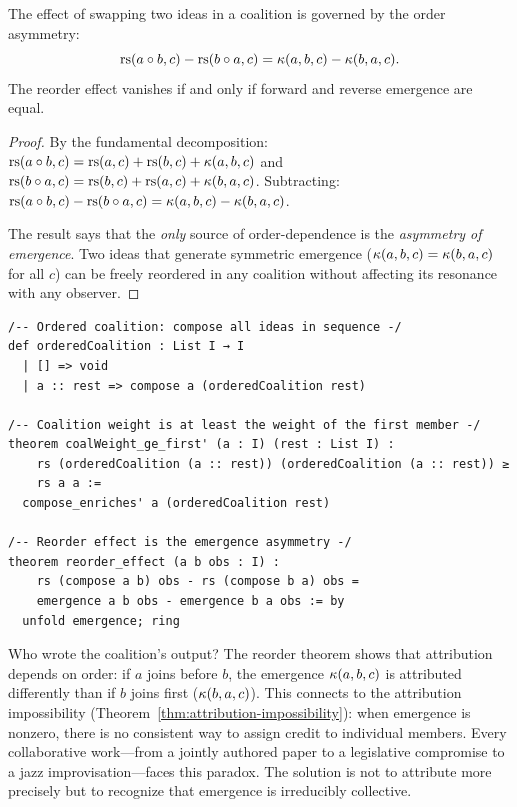 \begin{theorem}
\label{thm:reorder}
The effect of swapping two ideas in a coalition is governed by the
order asymmetry:
\[
\mathrm{rs}(a \circ b, c) - \mathrm{rs}(b \circ a, c) = \kappa(a, b, c) - \kappa(b, a, c).
\]
The reorder effect vanishes if and only if forward and reverse emergence
are equal.
\end{theorem}

\begin{proof}
By the fundamental decomposition:
$\mathrm{rs}(a \circ b, c) = \mathrm{rs}(a, c) + \mathrm{rs}(b, c) + \kappa(a, b, c)$ and
$\mathrm{rs}(b \circ a, c) = \mathrm{rs}(b, c) + \mathrm{rs}(a, c) + \kappa(b, a, c)$.
Subtracting: $\mathrm{rs}(a \circ b, c) - \mathrm{rs}(b \circ a, c)
= \kappa(a, b, c) - \kappa(b, a, c)$.

The result says that the \emph{only} source of order-dependence is the
\emph{asymmetry of emergence}. Two ideas that generate symmetric emergence
($\kappa(a, b, c) = \kappa(b, a, c)$ for all $c$) can be freely reordered
in any coalition without affecting its resonance with any observer.
\end{proof}

\begin{lstlisting}[caption={Lean 4: Coalition theory}]
/-- Ordered coalition: compose all ideas in sequence -/
def orderedCoalition : List I → I
  | [] => void
  | a :: rest => compose a (orderedCoalition rest)

/-- Coalition weight is at least the weight of the first member -/
theorem coalWeight_ge_first' (a : I) (rest : List I) :
    rs (orderedCoalition (a :: rest)) (orderedCoalition (a :: rest)) ≥
    rs a a :=
  compose_enriches' a (orderedCoalition rest)

/-- Reorder effect is the emergence asymmetry -/
theorem reorder_effect (a b obs : I) :
    rs (compose a b) obs - rs (compose b a) obs =
    emergence a b obs - emergence b a obs := by
  unfold emergence; ring
\end{lstlisting}

\begin{remark}
Who wrote the coalition's output? The reorder theorem shows that
attribution depends on order: if $a$ joins before $b$, the emergence
$\kappa(a, b, c)$ is attributed differently than if $b$ joins first
($\kappa(b, a, c)$). This connects to the attribution impossibility
(Theorem~\ref{thm:attribution-impossibility}): when emergence is
nonzero, there is no consistent way to assign credit to individual
members. Every collaborative work---from a jointly authored paper to
a legislative compromise to a jazz improvisation---faces this paradox.
The solution is not to attribute more precisely but to recognize that
emergence is irreducibly collective.
\end{remark}

